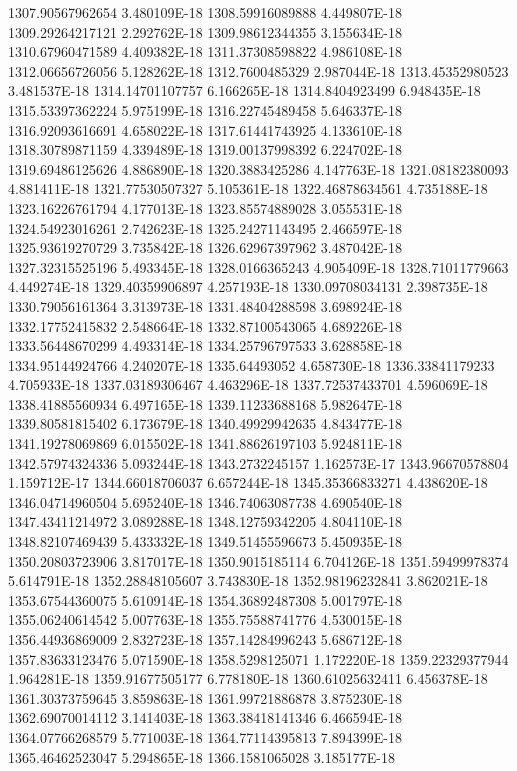 1307.90567962654  3.480109E-18
1308.59916089888  4.449807E-18
1309.29264217121  2.292762E-18
1309.98612344355  3.155634E-18
1310.67960471589  4.409382E-18
1311.37308598822  4.986108E-18
1312.06656726056  5.128262E-18
1312.7600485329  2.987044E-18
1313.45352980523  3.481537E-18
1314.14701107757  6.166265E-18
1314.8404923499  6.948435E-18
1315.53397362224  5.975199E-18
1316.22745489458  5.646337E-18
1316.92093616691  4.658022E-18
1317.61441743925  4.133610E-18
1318.30789871159  4.339489E-18
1319.00137998392  6.224702E-18
1319.69486125626  4.886890E-18
1320.3883425286  4.147763E-18
1321.08182380093  4.881411E-18
1321.77530507327  5.105361E-18
1322.46878634561  4.735188E-18
1323.16226761794  4.177013E-18
1323.85574889028  3.055531E-18
1324.54923016261  2.742623E-18
1325.24271143495  2.466597E-18
1325.93619270729  3.735842E-18
1326.62967397962  3.487042E-18
1327.32315525196  5.493345E-18
1328.0166365243  4.905409E-18
1328.71011779663  4.449274E-18
1329.40359906897  4.257193E-18
1330.09708034131  2.398735E-18
1330.79056161364  3.313973E-18
1331.48404288598  3.698924E-18
1332.17752415832  2.548664E-18
1332.87100543065  4.689226E-18
1333.56448670299  4.493314E-18
1334.25796797533  3.628858E-18
1334.95144924766  4.240207E-18
1335.64493052  4.658730E-18
1336.33841179233  4.705933E-18
1337.03189306467  4.463296E-18
1337.72537433701  4.596069E-18
1338.41885560934  6.497165E-18
1339.11233688168  5.982647E-18
1339.80581815402  6.173679E-18
1340.49929942635  4.843477E-18
1341.19278069869  6.015502E-18
1341.88626197103  5.924811E-18
1342.57974324336  5.093244E-18
1343.2732245157  1.162573E-17
1343.96670578804  1.159712E-17
1344.66018706037  6.657244E-18
1345.35366833271  4.438620E-18
1346.04714960504  5.695240E-18
1346.74063087738  4.690540E-18
1347.43411214972  3.089288E-18
1348.12759342205  4.804110E-18
1348.82107469439  5.433332E-18
1349.51455596673  5.450935E-18
1350.20803723906  3.817017E-18
1350.9015185114  6.704126E-18
1351.59499978374  5.614791E-18
1352.28848105607  3.743830E-18
1352.98196232841  3.862021E-18
1353.67544360075  5.610914E-18
1354.36892487308  5.001797E-18
1355.06240614542  5.007763E-18
1355.75588741776  4.530015E-18
1356.44936869009  2.832723E-18
1357.14284996243  5.686712E-18
1357.83633123476  5.071590E-18
1358.5298125071  1.172220E-18
1359.22329377944  1.964281E-18
1359.91677505177  6.778180E-18
1360.61025632411  6.456378E-18
1361.30373759645  3.859863E-18
1361.99721886878  3.875230E-18
1362.69070014112  3.141403E-18
1363.38418141346  6.466594E-18
1364.07766268579  5.771003E-18
1364.77114395813  7.894399E-18
1365.46462523047  5.294865E-18
1366.1581065028  3.185177E-18
